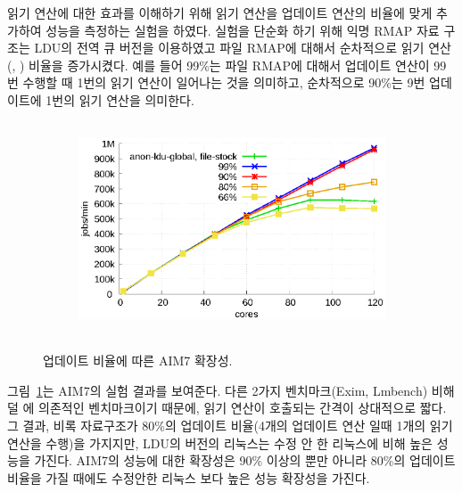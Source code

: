 읽기 연산에 대한 효과를 이해하기 위해 읽기 연산을 업데이트 연산의 비율에 
맞게 추가하여 성능을 측정하는 실험을 하였다.
실험을 단순화 하기 위해 익명 RMAP 자료 구조는 LDU의 전역 큐 버전을 이용하였고 
파일 RMAP에 대해서 순차적으로 읽기 연산(, ) 비율을 증가시켰다.
예를 들어 99\%는 파일 RMAP에 대해서 업데이트 연산이 99번 수행할 때 1번의 읽기 연산이 
일어나는 것을 의미하고, 순차적으로 90\%는 9번 업데이트에 1번의 읽기 연산을 의미한다.

\begin{figure}[h!]
    \centering
    \begin{subfigure}[b]{1\textwidth}
        \includegraphics[height=2.5in]{graph/ratio_aim7_core.eps}
    \end{subfigure}%
    \caption{업데이트 비율에 따른 AIM7 확장성.}
    \label{fig:UpdateRate_aim7_2}
\end{figure}
 
 
그림~\ref{fig:UpdateRate_aim7_2}는 AIM7의 실험 결과를 보여준다.
다른 2가지 벤치마크(Exim, Lmbench) 비해 덜 에 의존적인 벤치마크이기 때문에, 
읽기 연산이 호출되는 간격이 상대적으로 짧다.
그 결과, 비록 자료구조가 80\%의 업데이트 비율(4개의 업데이트 연산 일때 1개의 읽기 연산을 수행)을 
가지지만, LDU의 버전의 리눅스는 수정 안 한 리눅스에 비해 높은 성능을 가진다. 
AIM7의 성능에 대한 확장성은 90\% 이상의 뿐만 아니라 80\%의 업데이트 비율을 가질 때에도 수정안한 
리눅스 보다 높은 성능 확장성을 가진다.
 
